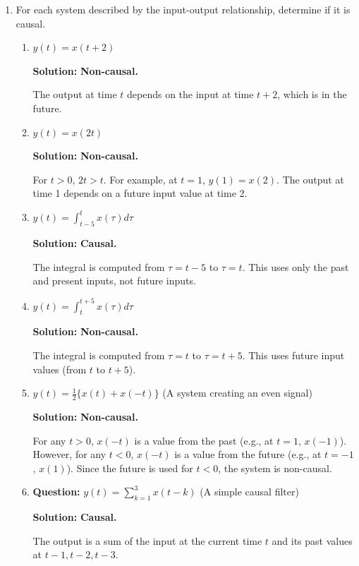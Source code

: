 \documentclass[nohyper,nobib,xcolor=dvipsnames,svgnames,x11names]{tufte-book}
\begin{document}
\begin{enumerate}
\item For each system described by the input-output relationship, determine if it is causal.

\begin{enumerate}


\item  $ y(t) = x(t + 2) $ 

\textbf{Solution:} \textbf{Non-causal.} 

The output at time $ t $ depends on the input at time $ t+2 $, which is in the future.

\item $ y(t) = x(2t) $ 

\textbf{Solution:} \textbf{Non-causal.} 

For $ t > 0 $, $ 2t > t $. For example, at $ t=1 $, $ y(1) = x(2) $. The output at time 1 depends on a future input value at time 2.

\item $ y(t) = \int_{t-5}^{t} x(\tau)  d\tau $

\textbf{Solution:} \textbf{Causal.}

The integral is computed from $ \tau = t-5 $ to $ \tau = t $. This uses only the past and present inputs, not future inputs.


\item $ y(t) = \int_{t}^{t+5} x(\tau)  d\tau $ 

\textbf{Solution:} \textbf{Non-causal.}

The integral is computed from $ \tau = t $ to $ \tau = t+5 $. This uses future input values (from $ t $ to $ t+5 $).


\item $ y(t) = \frac{1}{2} \{x(t) + x(-t)\} $ (A system creating an even signal)


\textbf{Solution:} \textbf{Non-causal.}

For any $ t > 0 $, $ x(-t) $ is a value from the past (e.g., at $ t=1 $, $ x(-1) $). However, for any $ t < 0 $, $ x(-t) $ is a value from the future (e.g., at $ t=-1 $, $ x(1) $). Since the future is used for $ t<0 $, the system is non-causal.

\item \textbf{Question:} $ y(t) = \sum_{k=1}^{3} x(t - k) $ (A simple causal filter)

\textbf{Solution:} \textbf{Causal.}

The output is a sum of the input at the current time $ t $ and its past values at $ t-1, t-2, t-3 $.



\end{enumerate}
\end{enumerate}
\end{document}
